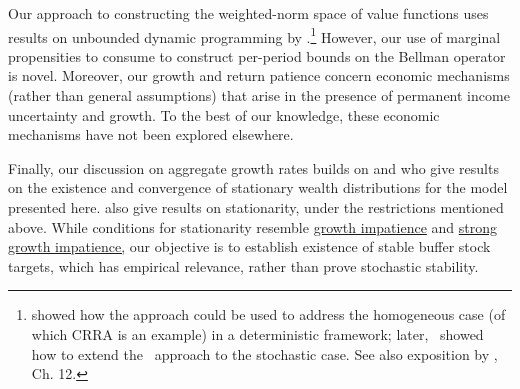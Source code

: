\documentclass[BufferStockTheory]{subfiles}
\begin{document}
Our approach to constructing the weighted-norm space of value functions uses results on unbounded dynamic programming by  \citep{jboydWeighted}.\footnote{\cite{asHomogeneous} showed how the approach could be used to address the homogeneous case (of which CRRA is an example) in a deterministic framework; later,~\cite{duranDiscounting} showed how to extend the~\cite{jboydWeighted} approach to the stochastic case.
See also exposition by \cite{stachurski2022}, Ch.
12.} However, our use of marginal propensities to consume to construct per-period bounds on the Bellman operator is novel.
Moreover, our  growth and return patience concern economic mechanisms (rather than general assumptions) that arise in the presence of permanent income uncertainty and growth.
To the best of our knowledge, these economic mechanisms have not been explored elsewhere.


Finally, our discussion on aggregate growth rates builds on \cite{szeidlInvariant} and \cite{harmenbergInvariant} who give results on the existence and convergence of stationary wealth distributions for the model presented here.
\cite{mstIncFluct} also give results on stationarity, under the restrictions mentioned above.
While conditions for stationarity resemble \hyperlink{GIC}{growth impatience} and \hyperlink{GICMod}{strong growth impatience,} our objective is to establish existence of stable buffer stock targets, which has empirical relevance, rather than prove stochastic stability.


\end{document}

